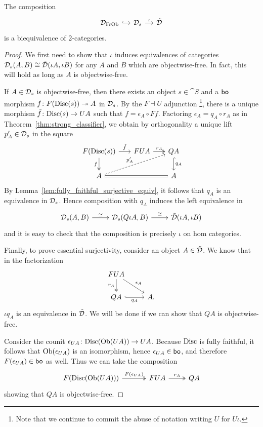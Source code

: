 \documentclass[11pt,oneside,article]{memoir}
\begin{document}
\begin{theorem}
    \label{thm:free_on_objects_strong_equivalence}
  The composition
  \[ \begin{tikzcd}[column sep=small]
    \ccatFrOb{D} \ar[r,hook]
      & \scat{D} \ar[r,"\iota"]
      & \pcat{D}
  \end{tikzcd} \]
  is a biequivalence of 2-categories.
\end{theorem}
\begin{proof}
  We first need to show that $\iota$ induces equivalences of categories
  $\mathcal{D}_s(A,B)\cong\tilde{\mathcal{D}}(\iota A,\iota B)$ for any $A$ and $B$ which are objectwise-free. In
  fact, this will hold as long as $A$ is objectwise-free.

  If $A\in\mathcal{D}_s$ is objectwise-free, then there exists an object $s\in\cat{S}$ and a $\mathsf{bo}$
  morphism $f\colon F(\mathrm{Disc}(s))\twoheadrightarrow A$ in $\mathcal{D}_s$. By the $F\dashv U$ adjunction%
  \footnote{Note that we continue to commit the abuse of notation writing $U$ for $U\iota$.}, there
  is a unique morphism $\tilde{f}\colon\mathrm{Disc}(s)\to UA$ such that $f=\epsilon_A\circ Ff$. Factoring
  $\epsilon_A=q_A\circ r_A$ as in Theorem~\ref{thm:strong_classifier}, we obtain by orthogonality a
  unique lift $p'_A\in\mathcal{D}_s$ in the square
  \[ \begin{tikzcd}[column sep=1.7em]
    F(\Disc(s)) \ar[d,two heads,"f"'] \ar[r,"\tilde{f}"]
      & FUA \ar[r,two heads,"r_A"]
      & QA \ar[d,hook,"q_A"] \\
    A \ar[urr,dashed,"p'_A"] \ar[rr,equal] && A
  \end{tikzcd} \]
  By Lemma~\ref{lem:fully_faithful_surjective_equiv}, it follows that $q_A$ is an equivalence in
  $\mathcal{D}_s$. Hence composition with $q_A$ induces the left equivalence in
  \[ \begin{tikzcd}
    \scat{D}(A,B) \ar[r,"\equiv"]
      & \scat{D}(Q\iota A,B) \ar[r,"\iso"]
      & \pcat{D}(\iota A,\iota B)
  \end{tikzcd} \]
  and it is easy to check that the composition is precisely $\iota$ on hom categories.

  Finally, to prove essential surjectivity, consider an object $A\in\tilde{\mathcal{D}}$. We know that in the
  factorization
  \[ \begin{tikzcd}
    FUA \ar[dr,"\epsilon_A"] \ar[d,two heads,"r_A"'] & \\
    QA \ar[r,hook,"q_A"'] & A.
  \end{tikzcd} \]
  $\iota q_A$ is an equivalence in $\tilde{\mathcal{D}}$. We will be done if we can show that $QA$ is
  objectwise-free.

  Consider the counit $\epsilon_{UA}\colon\mathrm{Disc}(\mathrm{Ob}(UA))\to UA$. Because $\mathrm{Disc}$ is fully faithful,
  it follows that $\mathrm{Ob}(\epsilon_{UA})$ is an isomorphism, hence $\epsilon_{UA}\in\mathsf{bo}$, and therefore
  $F(\epsilon_{UA})\in\mathsf{bo}$ as well. Thus we can take the composition
  \[ \begin{tikzcd}
    F(\Disc(\Ob(UA))) \ar[r,two heads,"F(\epsilon_{UA})"]
      &[1em] FUA \ar[r,two heads,"r_A"]
      & QA
  \end{tikzcd} \]
  showing that $QA$ is objectwise-free.
\end{proof}
\end{document}
